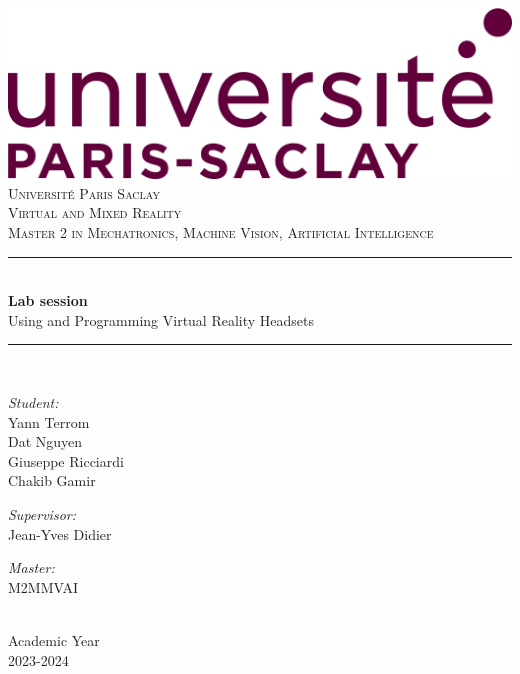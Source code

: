 \documentclass{article}
\begin{document}
\begin{titlepage}

    \centering
    \includegraphics[scale = 0.15]{./logo/upsay.png}\\[1.0 cm]
    \vspace*{3cm}
    \textsc{\LARGE Université Paris Saclay}\\[2.0 cm]
    \textsc{\Large Virtual and Mixed Reality}\\[0.5 cm]
    \textsc{\Large Master 2 in Mechatronics, Machine Vision, Artificial Intelligence}\\[0.5 cm]
    \rule{\linewidth}{0.2 mm} \\[0.4 cm]
    { \LARGE \textbf{Lab session} \\[0.4 cm] }
    { \Large {Using and Programming Virtual Reality Headsets} \\[0.4 cm] }
    \rule{\linewidth}{0.2 mm} \\[1.5 cm]
    
\begin{minipage}[t]{0.3\textwidth}
    \begin{flushleft} \large
        \emph{Student:}\\
        Yann Terrom\\
        Dat Nguyen\\
        Giuseppe Ricciardi\\
        Chakib Gamir
    \end{flushleft}
\end{minipage}
\begin{minipage}[t]{0.3\textwidth}
    \begin{center} \large
        \emph{Supervisor:}\\
        Jean-Yves Didier
    \end{center}
\end{minipage}
\begin{minipage}[t]{0.3\textwidth}
    \begin{flushright} \large
        \emph{Master:} \\
        M2MMVAI
    \end{flushright}
\end{minipage}\\[2 cm]
    
    {\large Academic Year}\\
    {2023-2024}	
    
\end{titlepage}
\end{document}
